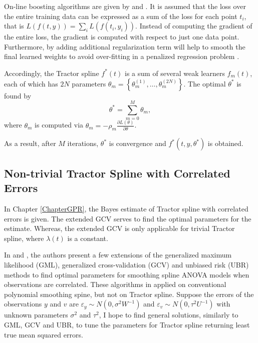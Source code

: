 On-line boosting algorithms are given by \cite{babenko2009family} and \cite{beygelzimer2015online}. It is assumed that the loss over the entire training data can be expressed as a sum of the loss for each point $t_i$, that is $L(f(t,y))=\sum_i L(f(t_i,y_i))$. Instead of computing the gradient of the entire loss, the gradient is computed with respect to just one data point. Furthermore, by adding additional regularization term will help to smooth the final learned weights to avoid over-fitting in a penalized regression problem \cite{chen2016xgboost}. 

Accordingly, the Tractor spline $f^*(t)$ is a sum of several weak learners $f_m(t)$, each of which has $2N$ parameters $\theta_m=\left\lbrace \theta_m^{(1)},\ldots,\theta_m^{(2N)}\right\rbrace$. The optimal $\theta^*$ is found by 
\begin{equation*}
\theta^*=\sum_{m=0}^{M}\theta_m,
\end{equation*}
where $\theta_m$ is computed via $\theta_m=-\rho_m\frac{\partial L(\theta)}{\partial \theta}$. 

As a result, after $M$ iterations, $\theta^*$ is convergence and $f^*(t,y,\theta^*)$ is obtained. 



\subsection*{Non-trivial Tractor Spline with Correlated Errors}

In Chapter \ref{ChapterGPR}, the Bayes estimate of Tractor spline with correlated errors is given. The extended GCV serves to find the optimal parameters for the estimate. Whereas, the extended GCV is only applicable for trivial Tractor spline, where $\lambda(t)$ is a constant. 


In \cite{opsomer2001nonparametric} and \cite{wang1998smoothing}, the authors present a few extensions of the generalized maximum likelihood (GML), generalized cross-validation (GCV) and unbiased risk (UBR) methods to find optimal parameters for smoothing spline ANOVA models when observations are correlated. These algorithms in applied on conventional polynomial smoothing spine, but not on Tractor spline. Suppose the errors of the observations $y$ and $v$ are $\varepsilon_y\sim N\left(0,\sigma^2W^{-1}\right)$ and $\varepsilon_v\sim N\left(0,\tau^2U^{-1}\right)$ with unknown parameters $\sigma^2$ and $\tau^2$, I hope to find general solutions, similarly to GML, GCV and UBR, to tune the parameters for Tractor spline returning least true mean squared errors. 




